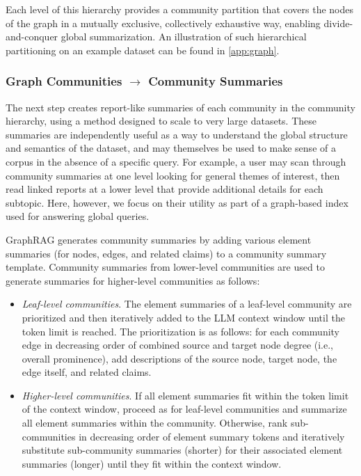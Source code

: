 \documentclass{article}
\begin{document}
Each level of this hierarchy provides a community partition that covers the nodes of the graph in a mutually exclusive, collectively exhaustive way, enabling divide-and-conquer global summarization.
An illustration of such hierarchical partitioning on an example dataset can be found in \autoref{app:graph}.

\subsubsection{Graph Communities \texorpdfstring{$\rightarrow$}{-->} Community Summaries}
The next step creates report-like summaries of each community in the community hierarchy, using a method designed to scale to very large datasets.
These summaries are independently useful as a way to understand the global structure and semantics of the dataset, and may themselves be used to make sense of a corpus in the absence of a specific query.
For example, a user may scan through community summaries at one level looking for general themes of interest, then read linked reports at a lower level that provide additional details for each subtopic.
Here, however, we focus on their utility as part of a graph-based index used for answering global queries.

GraphRAG generates community summaries by adding various element summaries (for nodes, edges, and related claims) to a community summary template.
Community summaries from lower-level communities are used to generate summaries for higher-level communities as follows:

\begin{itemize}
    \item \emph{Leaf-level communities}. The element summaries of a leaf-level community  are prioritized and then iteratively added to the LLM context window until the token limit is reached.
    The prioritization is as follows: for each community edge in decreasing order of combined source and target node degree (i.e., overall prominence), add descriptions of the source node, target node, the edge itself, and related claims.
    \item \emph{Higher-level communities}. If all element summaries fit within the token limit of the context window, proceed as for leaf-level communities and summarize all element summaries within the community.
    Otherwise, rank sub-communities in decreasing order of element summary tokens and iteratively substitute sub-community summaries (shorter) for their associated element summaries (longer) until they fit within the context window.
\end{itemize}
\end{document}
